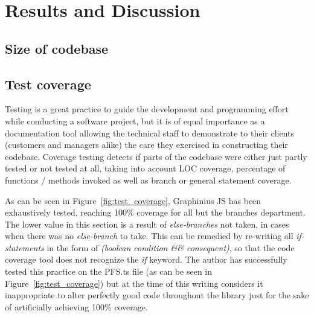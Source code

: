 \chapter{Results and Discussion}
\label{ch:results_discussion}


\section{Size of codebase}
\label{sect:complexity}


\section{Test coverage}
\label{sect:test_coverage}

Testing is a great practice to guide the development and programming effort while conducting a software project, but it is of equal importance as a documentation tool allowing the technical staff to demonstrate to their clients (customers and managers alike) the care they exercised in constructing their codebase. Coverage testing detects if parts of the codebase were either just partly tested or not tested at all, taking into account LOC coverage, percentage of functions / methods invoked as well as branch or general statement coverage.

As can be seen in Figure~\ref{fig:test_coverage}, Graphinius JS has been exhaustively tested, reaching 100\% coverage for all but the branches department. The lower value in this section is a result of \textit{else-branches} not taken, in cases when there was no \textit{else-branch} to take. This can be remedied by re-writing all \textit{if-statements} in the form of \textit{(boolean condition \&\& consequent)}, so that the code coverage tool does not recognize the \textit{if} keyword. The author has successfully tested this practice on the PFS.ts file (as can be seen in Figure~\ref{fig:test_coverage}) but at the time of this writing considers it inappropriate to alter perfectly good code throughout the library just for the sake of artificially achieving 100\% coverage.

